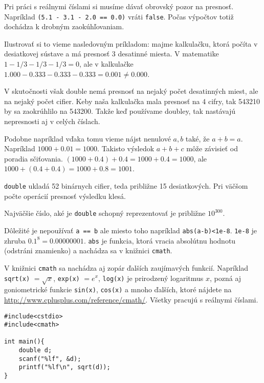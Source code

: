 \medskip

Pri práci s reálnymi číslami si musíme dávať obrovský pozor na presnosť.
Napríklad \verb!(5.1 - 3.1 - 2.0 == 0.0)! vráti \verb!false!. Počas výpočtov totiž
dochádza k drobným zaokúhľovaniam.

Ilustrovať si to vieme nasledovným príkladom: majme kalkulačku, ktorá počíta v
desiatkovej sústave a má presnosť 3 desatinné miesta.  V matematike $1 - 1/3 -
1/3 - 1/3 = 0$, ale v kalkulačke $1.000 - 0.333 - 0.333 - 0.333 = 0.001 \neq
0.000$. 

V skutočnosti však double nemá presnosť na nejaký počet desatinných miest, ale
na nejaký počet cifier. Keby naša kalkulačka mala presnosť na 4 cifry, tak
543210 by sa zaokrúhlilo na 543200. Takže keď používame doubley, tak nastávajú
nepresnosti aj v celých číslach.

Podobne napríklad vďaka tomu vieme nájst nenulové $a,b$ také, že $a + b = a$.
Napríklad $1000 + 0.01 = 1000$. Takisto výsledok $a + b + c$ môže závisieť od
poradia sčiťovania. $(1000 + 0.4) + 0.4 = 1000 + 0.4 = 1000$, ale $1000 + (0.4
+ 0.4) = 1000 + 0.8 = 1001$.

\medskip

\verb!double! ukladá 52 binárnych cifier, teda približne 15 desiatkových.  Pri
väčšom počte operácií presnosť výsledku klesá.

Najväčšie číslo, aké je \verb!double! schopný reprezentovať je približne
$10^{300}$.

\medskip

Dôležité je nepoužívať \verb!a == b! ale miesto toho napríklad
\verb!abs(a-b)<1e-8!.  \verb!1e-8! je zhruba $0.1^8 = 0.00000001$. \verb!abs!
je funkcia, ktorá vracia absolútnu hodnotu (odstráni znamienko) a nachádza sa v
knižnici \verb!cmath!.


V knižnici \verb!cmath! sa nachádza aj zopár ďalších zaujímavých funkcií. 
Napríklad \verb!sqrt(x)! $= \sqrt{x}$, \verb!exp(x)! $= e^x$, \verb!log(x)! je prirodzený
logaritmus $x$, pozná aj goniometrické funkcie \verb!sin(x)!, \verb!cos(x)! a mnoho ďalších,
ktoré nájdete na \url{http://www.cplusplus.com/reference/cmath/}. 
Všetky pracujú s reálnymi číslami.

\begin{lstlisting}
#include<cstdio>
#include<cmath>

int main(){
    double d;
    scanf("%lf", &d);
    printf("%lf\n", sqrt(d));
}
\end{lstlisting}










